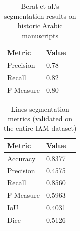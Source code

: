 \begin{table}[htbp]
\begin{center}
\begin{tabular}
{|p{100pt}|p{50pt}|p{50pt}|}
\hline
 Metric   & Value\\
\hline 
Precision & 0.78 \\ \hline
Recall & 0.82  \\ \hline
F-Measure & 0.80 \\ \hline

\end{tabular}
\end{center}
\captionsetup{justification=centering,margin=1cm}
\caption{Berat et al.'s segmentation results on historic Arabic manuscripts \cite{segmChallenging}}
\label{TableBeratSegResults}
\end{table}


\begin{table}[htbp]
\begin{center}
\begin{tabular}
{|p{100pt}|p{50pt}|p{50pt}|}
\hline
 Metric  &  Value \\
\hline 
Accuracy & 0.8377 \\ \hline
Precision & 0.4575 \\ \hline
Recall & 0.8560 \\ \hline
F-Measure & 0.5963 \\ \hline
IoU & 0.4031 \\ \hline
Dice & 0.5126 \\ \hline
\end{tabular}
\end{center}

\captionsetup{justification=centering,margin=1cm}
\caption{Lines segmentation metrics (validated on the entire IAM dataset)}
\label{TableSegmentationMetrics}
\end{table}

